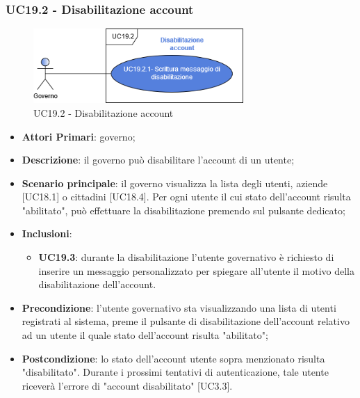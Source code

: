 \subsubsection{UC19.2 - Disabilitazione account}
\begin{figure}[h]
	\includegraphics[width=8cm]{res/images/UC19-2.png}
	\centering
	\caption{UC19.2 - Disabilitazione account}
\end{figure}
\begin{itemize}
	\item \textbf{Attori Primari}:
	governo;
	\item \textbf{Descrizione}: il governo può disabilitare l'account di un utente;
	\item \textbf{Scenario principale}: il governo visualizza la lista degli utenti, aziende [UC18.1] o cittadini [UC18.4]. Per ogni utente il cui stato dell'account risulta "abilitato", può effettuare la disabilitazione premendo sul pulsante dedicato;
	\item \textbf{Inclusioni}: 
	\begin{itemize}
		\item \textbf{UC19.3}: durante la disabilitazione l'utente governativo è richiesto di inserire un messaggio personalizzato per spiegare all'utente il motivo della disabilitazione dell'account.
	\end{itemize}
	\item \textbf{Precondizione}: l'utente governativo sta visualizzando una lista di utenti registrati al sistema, preme il pulsante di disabilitazione dell'account relativo ad un utente il quale stato dell'account risulta "abilitato";
	\item \textbf{Postcondizione}: lo stato  dell'account utente sopra menzionato risulta "disabilitato". Durante i prossimi tentativi di autenticazione, tale utente riceverà l'errore di "account disabilitato" [UC3.3].
\end{itemize} 

